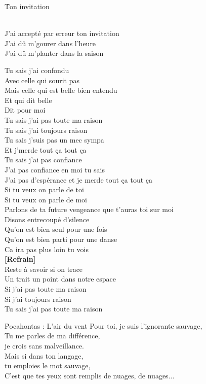 \documentclass{novel}
\begin{document}
\newpage
\normalsize
\h*{Ton invitation}

\begin{bfseries}
[Refrain:]\\
J'ai accepté par erreur ton invitation \\
J'ai dû m'gourer dans l'heure \\
J'ai dû m'planter dans la saison \\
\end{bfseries}

Tu sais j'ai confondu \\
Avec celle qui sourit pas \\
Mais celle qui est belle bien entendu \\
Et qui dit belle \\
Dit pour moi \\
Tu sais j'ai pas toute ma raison \\
Tu sais j'ai toujours raison \\
Tu sais j'suis pas un mec sympa \\
Et j'merde tout ça tout ça \\
Tu sais j'ai pas confiance \\
J'ai pas confiance en moi tu sais \\
J'ai pas d'espérance et je merde tout ça tout ça \\
Si tu veux on parle de toi \\
Si tu veux on parle de moi \\
Parlons de ta future vengeance que t'auras toi sur moi \\
Disons entrecoupé d'silence \\
Qu'on est bien seul pour une fois \\
Qu'on est bien parti pour une danse \\
Ca ira pas plus loin tu vois \\

\textbf{[Refrain]}\\

Reste à savoir si on trace \\
Un trait un point dans notre espace \\
Si j'ai pas toute ma raison \\
Si j'ai toujours raison \\
Tu sais j'ai pas toute ma raison

\newpage
\small
\h*{Pocahontas : L’air du vent}
Pour toi, je suis l'ignorante sauvage, \\
Tu me parles de ma différence, \\
je crois sans malveillance. \\
Mais si dans ton langage, \\
tu emploies le mot sauvage, \\
C'est que tes yeux sont remplis de nuages, de nuages... \\
\end{document}
